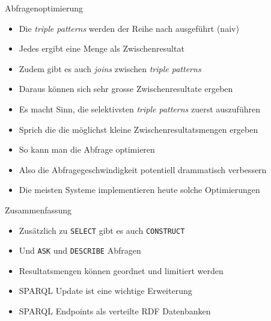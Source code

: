 \documentclass{beamer}
\begin{document}
\begin{frame}{Abfragenoptimierung}
	
	\begin{itemize}
		\item Die \emph{triple patterns} werden der Reihe nach ausgeführt (naiv)
		\item Jedes ergibt eine Menge als Zwischenresultat
		\item Zudem gibt es auch \emph{joins} zwischen \emph{triple patterns}
		\item Daraus können sich sehr grosse Zwischenresultate ergeben
		\item Es macht Sinn, die selektivsten \emph{triple patterns} zuerst auszuführen
		\item Sprich die die möglichst kleine Zwischenresultatsmengen ergeben
		\item So kann man die Abfrage optimieren
		\item Also die Abfragegeschwindigkeit potentiell drammatisch verbessern
		\item Die meisten Systeme implementieren heute solche Optimierungen
	\end{itemize}
	
\end{frame}

\begin{frame}{Zusammenfassung}
	
	\begin{itemize}
		\item Zusätzlich zu \texttt{SELECT} gibt es auch \texttt{CONSTRUCT}
		\item Und \texttt{ASK} und \texttt{DESCRIBE} Abfragen
		\item Resultatsmengen können geordnet und limitiert werden
		\item SPARQL Update ist eine wichtige Erweiterung
		\item SPARQL Endpoints als verteilte RDF Datenbanken
	\end{itemize}
	
\end{frame}
\end{document}
